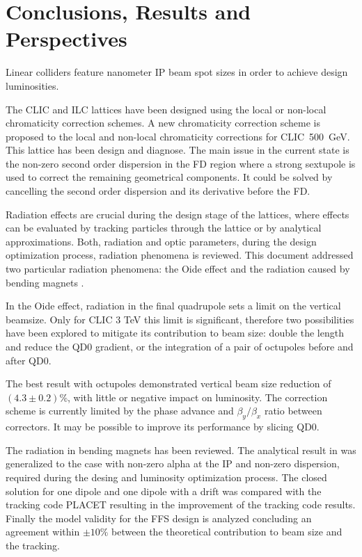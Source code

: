 \chapter*{Conclusions, Results and Perspectives}
Linear colliders feature nanometer IP beam spot sizes in order to achieve design luminosities.\par
The CLIC and ILC lattices have been designed using the local or non-local chromaticity correction schemes. A new chromaticity correction scheme is proposed to the local and non-local chromaticity corrections for CLIC~500~GeV. This lattice has been design and diagnose. The main issue in the current state is the non-zero second order dispersion in the FD region where a strong sextupole is used to correct the remaining geometrical components. It could be solved by cancelling the second order dispersion and its derivative before the FD.\par
Radiation effects are crucial during the design stage of the lattices, where effects can be evaluated by tracking particles through the lattice or by analytical approximations. Both, radiation and optic parameters, during the design optimization process, radiation phenomena is reviewed. This document addressed two particular radiation phenomena: the Oide effect \cite{Oide} and the radiation caused by bending magnets \cite{Sands}.\par
In the Oide effect, radiation in the final quadrupole sets a limit on the vertical beamsize. Only for CLIC 3 TeV this limit is significant, therefore two possibilities have been explored to mitigate its contribution to beam size: double the length and reduce the QD0 gradient, or the integration of a pair of octupoles before and after QD0.\par
The best result with octupoles demonstrated vertical beam size reduction of $(4.3\pm0.2)$\%, with little or negative impact on luminosity. The correction scheme is currently limited by the phase advance and $\beta_y/\beta_x$ ratio between correctors. It may be possible to improve its performance by slicing QD0.\par
The radiation in bending magnets has been reviewed. The analytical result in \cite{Sands} was generalized to the case with non-zero alpha at the IP and non-zero dispersion, required during the desing and luminosity optimization process. The closed solution for one dipole and one dipole with a drift was compared with the tracking code PLACET \cite{Placet} resulting in the improvement of the tracking code results. Finally the model validity for the FFS design is analyzed concluding an agreement within $\pm10\%$ between the theoretical contribution to beam size and the tracking.\par

